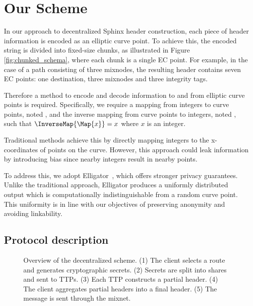 \section{Our Scheme}\label{sec:scheme}

In our approach to decentralized Sphinx header construction, each piece of header information is encoded as an elliptic curve point. 
To achieve this, the encoded string is divided into fixed-size chunks, as illustrated in Figure \ref{fig:chunked_schema}, where each chunk is a single EC point. 
For example, in the case of a path consisting of three mixnodes, the resulting header contains seven EC points: one destination, three mixnodes and three integrity tags.

Therefore a method to encode and decode information to and from elliptic curve points is required. 
Specifically, we require a mapping from integers to curve points, noted \Map{}, and the inverse mapping from curve points to integers, noted \InverseMap{}, 
such that $\InverseMap{\Map{x}} = x$ where $x$ is an integer.

Traditional methods achieve this by directly mapping integers to the x-coordinates of points on the curve. 
However, this approach could leak information by introducing bias since nearby integers result in nearby points.

To address this, we adopt Elligator~\cite{bernstein2013elligator}, which offers stronger privacy guarantees. 
Unlike the traditional approach, Elligator produces a uniformly distributed output which is computationally indistinguishable from a random curve point. 
This uniformity is in line with our objectives of preserving anonymity and avoiding linkability. 

\subsection{Protocol description}

\begin{figure}[t]
    \centering
    \resizebox{1.\linewidth}{!}{}
    \caption{Overview of the decentralized scheme. 
    (1) The client selects a route and generates cryptographic secrets. 
    (2) Secrets are split into shares and sent to TTPs. 
    (3) Each TTP constructs a partial header. 
    (4) The client aggregates partial headers into a final header. 
    (5) The message is sent through the mixnet.}
    \label{fig:overall_schema}
\end{figure}

